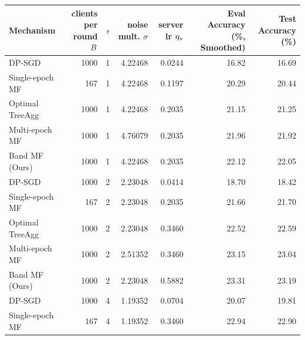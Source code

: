 \begin{tabular}{lrrrrrr}
\toprule
       Mechanism &
       \parbox{1.5cm}{clients per round $B$} &
       $\epsilon$ &
       \parbox{1.3cm}{noise mult. $\sigma$} &
       \parbox{1cm}{server\\ lr $\eta_s$} &
       \parbox{1.9cm}{Eval Accuracy (\%, Smoothed)} &
       \parbox{1.9cm}{Test Accuracy (\%)} \\
\midrule
          DP-SGD &           1000 &          1 &          4.22468 &             0.0244 &                             16.82 &             16.69 \\
 Single-epoch MF &            167 &          1 &          4.22468 &             0.1197 &                             20.29 &             20.44 \\
 Optimal TreeAgg &           1000 &          1 &          4.22468 &             0.2035 &                             21.15 &             21.25 \\
  Multi-epoch MF &           1000 &          1 &          4.76079 &             0.2035 &                             21.96 &             21.92 \\
  Band MF (Ours) &           1000 &          1 &          4.22468 &             0.2035 &                             22.12 &             22.05 \\
\midrule  
          DP-SGD &           1000 &          2 &          2.23048 &             0.0414 &                             18.70 &             18.42 \\
 Single-epoch MF &            167 &          2 &          2.23048 &             0.2035 &                             21.66 &             21.70 \\
 Optimal TreeAgg &           1000 &          2 &          2.23048 &             0.3460 &                             22.52 &             22.59 \\
  Multi-epoch MF &           1000 &          2 &          2.51352 &             0.3460 &                             23.15 &             23.04 \\
  Band MF (Ours) &           1000 &          2 &          2.23048 &             0.5882 &                             23.31 &             23.19 \\
\midrule  
          DP-SGD &           1000 &          4 &          1.19352 &             0.0704 &                             20.07 &             19.81 \\
 Single-epoch MF &            167 &          4 &          1.19352 &             0.3460 &                             22.94 &             22.90 \\

\end{tabular}
